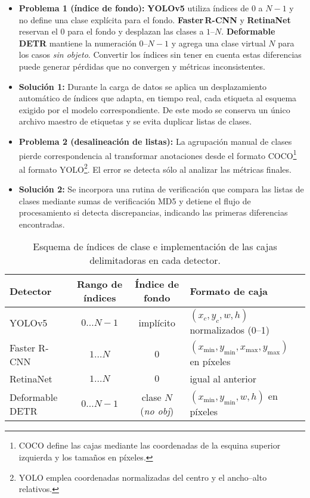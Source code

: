 \begin{itemize}
  \item \textbf{Problema 1 (índice de fondo):}
        \textbf{YOLOv5} utiliza índices de \(0\) a \(N-1\) y no define una clase explícita para el fondo.
        \textbf{Faster\,R-CNN} y \textbf{RetinaNet} reservan el \(0\) para el fondo y desplazan las clases a \(1\)–\(N\).
        \textbf{Deformable DETR} mantiene la numeración \(0\)–\(N-1\) y agrega una clase virtual \(N\) para los casos \emph{sin objeto}.
        Convertir los índices sin tener en cuenta estas diferencias puede generar pérdidas que no convergen y métricas inconsistentes.

  \item \textbf{Solución 1:}
        Durante la carga de datos se aplica un desplazamiento automático de índices que adapta, en tiempo real, cada etiqueta al esquema exigido por el modelo correspondiente.
        De este modo se conserva un único archivo maestro de etiquetas y se evita duplicar listas de clases.

  \item \textbf{Problema 2 (desalineación de listas):}
        La agrupación manual de clases pierde correspondencia al transformar anotaciones desde el formato COCO\footnote{COCO define las cajas mediante las coordenadas de la esquina superior izquierda y los tamaños en píxeles.} al formato YOLO\footnote{YOLO emplea coordenadas normalizadas del centro y el ancho–alto relativos.}.
        El error se detecta sólo al analizar las métricas finales.

  \item \textbf{Solución 2:}
        Se incorpora una rutina de verificación que compara las listas de clases mediante sumas de verificación MD5 y detiene el flujo de procesamiento si detecta discrepancias, indicando las primeras diferencias encontradas.
\end{itemize}

\begin{table}[!h]
\centering
\caption{Esquema de índices de clase e implementación de las cajas delimitadoras en cada detector.}
\label{tab:label_schemes}
\begin{tabularx}{\textwidth}{|l|c|c|X|}
\hline
\textbf{Detector} & \textbf{Rango de índices} & \textbf{Índice de fondo} & \textbf{Formato de caja} \\ \hline
YOLOv5            & \(0\dots N-1\)           & implícito                & \((x_c,y_c,w,h)\) normalizados (0–1) \\ \hline
Faster R-CNN      & \(1\dots N\)             & \(0\)                    & \((x_{\min},y_{\min},x_{\max},y_{\max})\) en píxeles \\ \hline
RetinaNet         & \(1\dots N\)             & \(0\)                    & igual al anterior \\ \hline
Deformable DETR   & \(0\dots N-1\)           & clase \(N\) (\emph{no obj}) & \((x_{\min},y_{\min},w,h)\) en píxeles \\ \hline
\end{tabularx}
\end{table}


